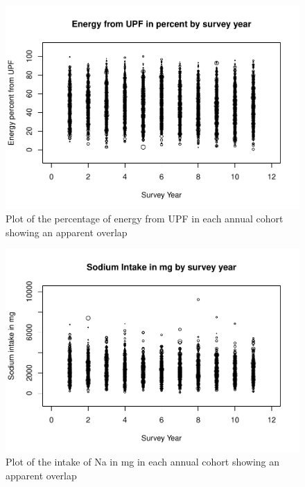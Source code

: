 \documentclass[
]{article}
\begin{document}
\begin{figure}
\centering
\includegraphics{methodandresults_files/figure-latex/fig-upf-and-survey-year-1.pdf}
\caption{Plot of the percentage of energy from UPF in each annual cohort
showing an apparent overlap}
\end{figure}

\begin{figure}
\centering
\includegraphics{methodandresults_files/figure-latex/fig-Na-and-survey-year-1.pdf}
\caption{Plot of the intake of Na in mg in each annual cohort showing an
apparent overlap}
\end{figure}
\end{document}
